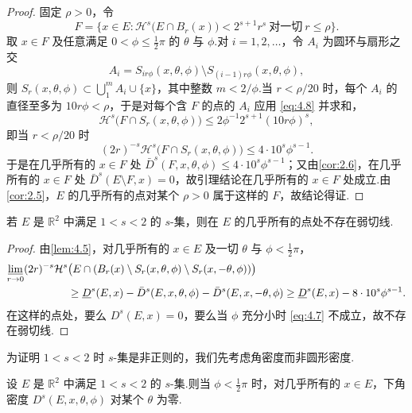 \begin{proof}
固定 $\rho>0$，令
\begin{equation}\label{eq:4.8}
  F=\{x\in E:\mathcal{H}^{s}\bigl(E\cap B_r(x)\bigr)<2^{s+1}r^{s}\ \text{对一切}\ r\leq\rho\}.
\end{equation}
取 $x\in F$ 及任意满足 $0<\phi\leq\frac{1}{2}\pi$ 的 $\theta$ 与 $\phi$.对 $i=1,2,\ldots$，令 $A_i$ 为圆环与扇形之交
\[
  A_i=S_{ir\phi}(x,\theta,\phi)\setminus S_{(i-1)r\phi}(x,\theta,\phi),
\]
则 $S_r(x,\theta,\phi)\subset\bigcup_{1}^{m}A_i\cup\{x\}$，其中整数 $m<2/\phi$.当 $r<\rho/20$ 时，每个 $A_i$ 的直径至多为 $10r\phi<\rho$，于是对每个含 $F$ 的点的 $A_i$ 应用 \eqref{eq:4.8} 并求和，
\[
  \mathcal{H}^{s}\bigl(F\cap S_r(x,\theta,\phi)\bigr)\leq 2\phi^{-1}2^{s+1}(10r\phi)^{s},
\]
即当 $r<\rho/20$ 时
\[
  (2r)^{-s}\mathcal{H}^{s}\bigl(F\cap S_r(x,\theta,\phi)\bigr)\leq 4\cdot 10^{s}\phi^{s-1}.
\]
于是在几乎所有的 $x\in F$ 处 $\bar{D}^s(F,x,\theta,\phi)\leq 4\cdot 10^{s}\phi^{s-1}$；又由\cref{cor:2.6}，在几乎所有的 $x\in F$ 处 $\bar{D}^s(E\setminus F,x)=0$，故引理结论在几乎所有的 $x\in F$ 处成立.由\cref{cor:2.5}，$E$ 的几乎所有的点对某个 $\rho>0$ 属于这样的 $F$，故结论得证.
\end{proof}

\begin{corollary}\label{cor:4.6}
若 $E$ 是 $\mathbb{R}^2$ 中满足 $1<s<2$ 的 $s$-集，则在 $E$ 的几乎所有的点处不存在弱切线.
\end{corollary}

\begin{proof}
由\cref{lem:4.5}，对几乎所有的 $x\in E$ 及一切 $\theta$ 与 $\phi<\frac{1}{2}\pi$，
\begin{align*}
  \varliminf_{r\to 0}(2r)^{-s}\mathcal{H}^{s}&\bigl(E\cap(B_r(x)\setminus S_r(x,\theta,\phi)\setminus S_r(x,-\theta,\phi))\bigr)\\
  &\geq\underline{D}^{s}(E,x)-\bar{D}^{s}(E,x,\theta,\phi)-\bar{D}^{s}(E,x,-\theta,\phi)
  \geq\underline{D}^{s}(E,x)-8\cdot 10^{s}\phi^{s-1}.
\end{align*}
在这样的点处，要么 $D^s(E,x)=0$，要么当 $\phi$ 充分小时 \eqref{eq:4.7} 不成立，故不存在弱切线.
\end{proof}

为证明 $1<s<2$ 时 $s$-集是非正则的，我们先考虑角密度而非圆形密度.

\begin{theorem}\label{thm:4.7}
设 $E$ 是 $\mathbb{R}^2$ 中满足 $1<s<2$ 的 $s$-集.则当 $\phi<\frac{1}{2}\pi$ 时，对几乎所有的 $x\in E$，下角密度 $D^s(E,x,\theta,\phi)$ 对某个 $\theta$ 为零.
\end{theorem}

